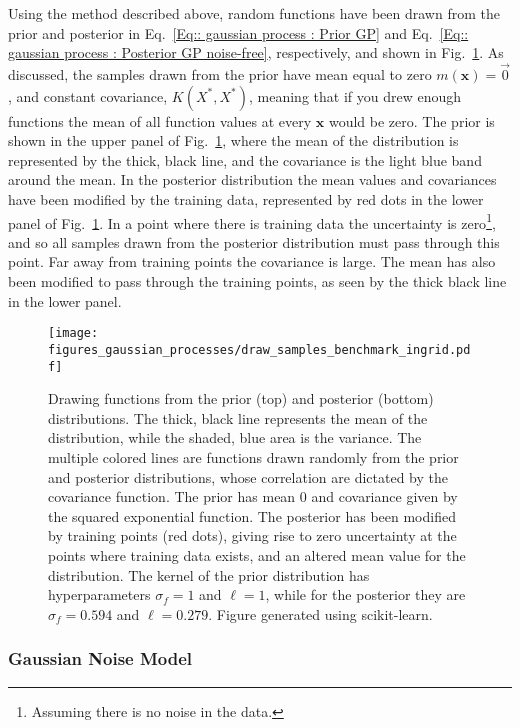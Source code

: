 \documentclass[twoside,english]{uiofysmaster}
\begin{document}
{Using the method described above, random functions have been drawn from the prior and posterior in Eq.~\ref{Eq:: gaussian process : Prior GP} and Eq.~\ref{Eq:: gaussian process : Posterior GP noise-free}, respectively, and shown in Fig.~\ref{Fig:: gaussian process : prior posterior drawn samples}. As discussed, the samples drawn from the prior have mean equal to zero $m(\textbf{x})=\vec{0}$, and constant covariance, $K(X^*, X^*)$, meaning that if you drew enough functions the mean of all function values at every $\textbf{x}$ would be zero. The prior is shown in the upper panel of Fig.~\ref{Fig:: gaussian process : prior posterior drawn samples}, where the mean of the distribution is represented by the thick, black line, and the covariance is the light blue band around the mean. In the posterior distribution the mean values and covariances have been modified by the training data, represented by red dots in the lower panel of Fig.~\ref{Fig:: gaussian process : prior posterior drawn samples}. In a point where there is training data the uncertainty is zero\footnote{Assuming there is no noise in the data.}, and so all samples drawn from the posterior distribution must pass through this point. Far away from training points the covariance is large. The mean has also been modified to pass through the training points, as seen by the thick black line in the lower panel.

\begin{figure}
\centering
\texttt{[image: figures\_gaussian\_processes/draw\_samples\_benchmark\_ingrid.pdf]}
\caption{Drawing functions from the prior (top) and posterior (bottom) distributions. The thick, black line represents the mean of the distribution, while the shaded, blue area is the variance. The multiple colored lines are functions drawn randomly from the prior and posterior distributions, whose correlation are dictated by the covariance function. The prior has mean 0 and covariance given by the squared exponential function. The posterior has been modified by training points (red dots), giving rise to zero uncertainty at the points where training data exists, and an altered mean value for the distribution. The kernel of the prior distribution has hyperparameters $\sigma_f = 1$ and $\ell = 1$, while for the posterior they are $\sigma_f = 0.594$ and $\ell = 0.279$. Figure generated using scikit-learn.}
\label{Fig:: gaussian process : prior posterior drawn samples}
\end{figure}

\subsubsection{Gaussian Noise Model}\label{Sec: gaussian process : Gaussian Noise Model}

}
\end{document}
